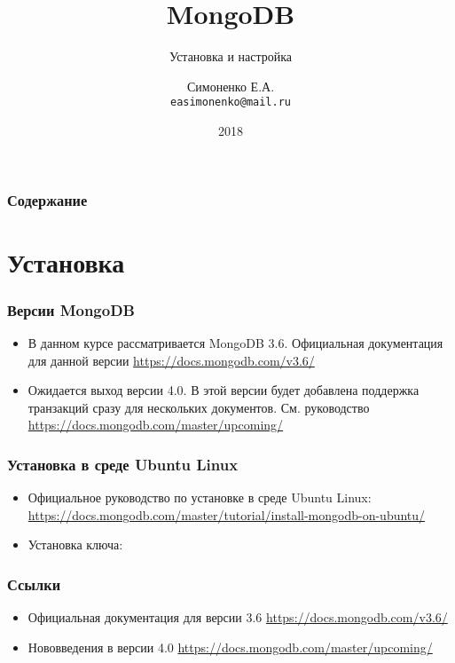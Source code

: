 \documentclass[11pt]{beamer}
\begin{document}
\author{Симоненко Е.А. \\ \texttt{easimonenko@mail.ru}}
\title{MongoDB}
\subtitle{Установка и настройка}
\date{2018}

\begin{frame}
\titlepage
\end{frame}

\begin{frame}
\frametitle{Содержание}
\tableofcontents
\end{frame}

\section{Установка}

\begin{frame}
\frametitle{Версии MongoDB}
\begin{itemize}
  \item В данном курсе рассматривается MongoDB 3.6. Официальная документация 
  для данной версии \url{https://docs.mongodb.com/v3.6/}
  \item Ожидается выход версии 4.0. В этой версии будет добавлена поддержка 
  транзакций сразу для нескольких документов. См. руководство 
  \url{https://docs.mongodb.com/master/upcoming/}
\end{itemize}
\end{frame}

\begin{frame}
\frametitle{Установка в среде Ubuntu Linux}
\begin{itemize}
  \item Официальное руководство по установке в среде Ubuntu Linux: 
  \url{https://docs.mongodb.com/master/tutorial/install-mongodb-on-ubuntu/}
  \item Установка ключа:
  
\end{itemize}
\end{frame}

\begin{frame}
\frametitle{Ссылки}
\begin{itemize}
  \item Официальная документация для версии 3.6 
  \url{https://docs.mongodb.com/v3.6/}
  \item Нововведения в версии 4.0
  \url{https://docs.mongodb.com/master/upcoming/}
\end{itemize}
\end{frame}
\end{document}

